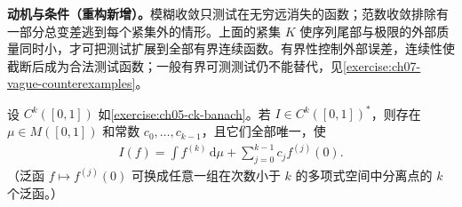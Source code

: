 \documentclass[../../main.tex]{subfiles}
\begin{document}
\begin{remark}
\textbf{动机与条件（重构新增）。}模糊收敛只测试在无穷远消失的函数；范数收敛排除有一部分总变差逃到每个紧集外的情形。上面的紧集 $K$ 使序列尾部与极限的外部质量同时小，才可把测试扩展到全部有界连续函数。有界性控制外部误差，连续性使截断后成为合法测试函数；一般有界可测测试仍不能替代，见\cref{exercise:ch07-vague-counterexamples}。
\end{remark}
\begin{exercise}\label{exercise:ch07-ck-dual}
设 $C^k([0,1])$ 如\cref{exercise:ch05-ck-banach}。若 $I\in C^k([0,1])^*$，则存在 $\mu\in M([0,1])$ 和常数 $c_0,\ldots,c_{k-1}$，且它们全部唯一，使
\begin{align*}
I(f)=\int f^{(k)}\,\mathrm d\mu+\sum_{j=0}^{k-1}c_jf^{(j)}(0).
\end{align*}
（泛函 $f\mapsto f^{(j)}(0)$ 可换成任意一组在次数小于 $k$ 的多项式空间中分离点的 $k$ 个泛函。）
\end{exercise}
\end{document}
